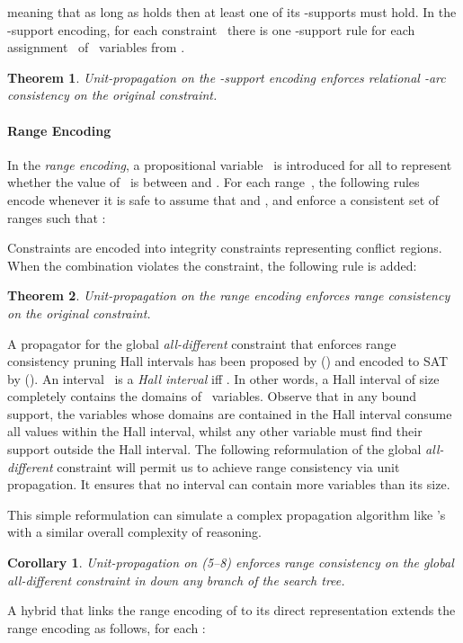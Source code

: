 \documentclass[letterpaper]{article}
\newtheorem{theorem}{Theorem}
\newtheorem{corollary}{Corollary}[theorem]
\newcommand{\citeap}[1]{\citeauthor{#1} (\citeyear{#1})}
\begin{document}
meaning that as long as  holds then at least one of its -supports  must hold.
In the -support encoding, for each constraint~ there is one -support rule for each assignment~ of ~variables from .
\begin{theorem}
Unit-propagation on the -support encoding enforces relational -arc consistency on the original constraint.
\end{theorem}


\paragraph{Range Encoding}
In the \emph{range encoding}, a propositional variable~ is introduced for all  to represent whether the value of~ is between  and . For each range~, the following  rules encode  whenever it is safe to assume that  and , and enforce a consistent set of ranges such that :

Constraints are encoded into integrity constraints representing conflict regions. When the combination  violates the constraint, the following rule is added:

\begin{theorem}
Unit-propagation on the range encoding enforces range consistency on the original constraint.
\end{theorem}
A propagator for the global \emph{all-different} constraint that enforces range consistency pruning Hall intervals has been proposed by \citeap{le96a} and encoded to SAT by \citeap{bekanaquwa09a}.
An interval~ is a \emph{Hall interval} iff . In other words, a Hall interval of size~ completely contains the domains of ~variables. Observe that in any bound support, the variables whose domains are contained in the Hall interval consume all values within the Hall interval, whilst any other variable must find their support outside the Hall interval.
The following reformulation of the global \emph{all-different} constraint will permit us to achieve range consistency via unit propagation. It ensures that no interval  can contain more variables than its size. 

This simple reformulation can simulate a complex propagation algorithm like \citeauthor{le96a}'s with a similar overall complexity of reasoning.
\begin{corollary}
Unit-propagation on (5--8) enforces range consistency on the global \emph{all-different} constraint in  down any branch of the search tree.
\end{corollary}
A hybrid that links the range encoding of  to its direct representation extends the range encoding as follows, for each :
\end{document}
